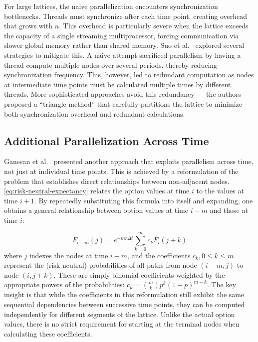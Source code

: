 \documentclass[english,12pt,a4paper,pdftex,sci,utf8]{aaltothesis}
\begin{document}
For large lattices, the naive parallelization encounters synchronization bottlenecks. Threads must synchronize after each time point, creating overhead that grows with $n$. This overhead is particularly severe when the lattice exceeds the capacity of a single streaming multiprocessor, forcing communication via slower global memory rather than shared memory. Suo et al.\ \cite{suo2015gpu} explored several strategies to mitigate this. A naive attempt sacrificed parallelism by having a thread compute multiple nodes over several periods, thereby reducing synchronization frequency. This, however, led to redundant computation as nodes at intermediate time points must be calculated multiple times by different threads. More sophisticated approaches avoid this redundancy --- the authors proposed a ``triangle method'' that carefully partitions the lattice to minimize both synchronization overhead and redundant calculations.
\clearpage

\subsection{Additional Parallelization Across Time}
Ganesan et al.\ \cite{ganesan2009acceleration} presented another approach that exploits parallelism across time, not just at individual time points. This is achieved by a reformulation of the problem that establishes direct relationships between non-adjacent nodes. \cref{eq:risk-neutral-expectancy} relates the option values at time $i$ to the values at time $i+1$. By repeatedly substituting this formula into itself and expanding, one obtains a general relationship between option values at time $i-m$ and those at time $i$:

\begin{equation}
    F_{i-m}(j) = e^{-m r \Delta t} \sum_{k=0}^m c_k F_i(j+k)
\label{eq:relative-prices}
\end{equation}
where $j$ indexes the nodes at time $i-m$, and the coefficients $c_k, 0 \leq k \leq m$ represent the (risk-neutral) probabilities of all paths from node $(i-m,j)$ to node $(i,j+k)$. These are simply binomial coefficients weighted by the appropriate powers of the probabilities: $c_k = \binom{m}{k}p^k(1-p)^{m-k}$. The key insight is that while the coefficients in this reformulation still exhibit the same sequential dependencies between successive time points, they can be computed independently for different segments of the lattice. Unlike the actual option values, there is no strict requirement for starting at the terminal nodes when calculating these coefficients.
\end{document}
